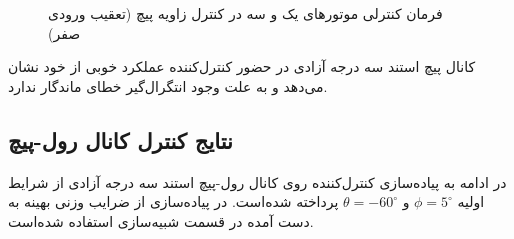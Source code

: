 \documentclass{CCI2020}
\begin{document}
\begin{figure}[H]
	\centering
	
	\caption{فرمان کنترلی موتورهای یک و سه در کنترل زاویه پیچ (تعقیب ورودی صفر)}
\end{figure}
کانال پیچ استند سه درجه آزادی در حضور کنترل‌کننده  عملکرد خوبی از خود نشان می‌دهد و به علت وجود انتگرال‌گیر خطای ماندگار ندارد.





\subsection{نتایج کنترل کانال رول-پیچ}\label{roll_pitch_lqidg_section}
در ادامه به پیاده‌سازی کنترل‌کننده  روی کانال رول-پیچ استند سه درجه آزادی از شرایط اولیه
$\phi = 5^{\circ}$
و
$\theta = -60^{\circ}$
پرداخته شده‌است.
در پیاده‌سازی از ضرایب وزنی بهینه به دست آمده در قسمت شبیه‌سازی استفاده شده‌است.
\end{document}
